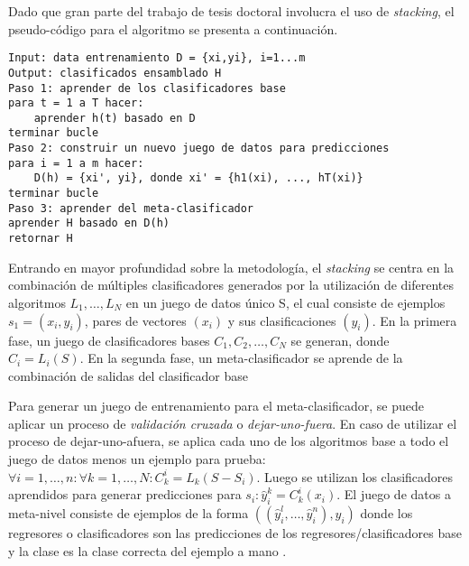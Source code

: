 Dado que gran parte del trabajo de tesis doctoral involucra el uso de \emph{stacking}, el pseudo-código para el algoritmo se presenta a continuación. \\

\begin{lstlisting}
Input: data entrenamiento D = {xi,yi}, i=1...m
Output: clasificados ensamblado H
Paso 1: aprender de los clasificadores base
para t = 1 a T hacer:
	aprender h(t) basado en D
terminar bucle
Paso 2: construir un nuevo juego de datos para predicciones
para i = 1 a m hacer:
	D(h) = {xi', yi}, donde xi' = {h1(xi), ..., hT(xi)}
terminar bucle
Paso 3: aprender del meta-clasificador
aprender H basado en D(h)
retornar H
\end{lstlisting}

Entrando en mayor profundidad sobre la metodología, el \emph{stacking} se centra en la combinación de múltiples clasificadores generados por la utilización de diferentes algoritmos $L_1, \ldots, L_N$ en un juego de datos único S, el cual consiste de ejemplos $s_1 = (x_i, y_i)$, pares de vectores $(x_i)$ y sus clasificaciones $(y_i)$. En la primera fase, un juego de clasificadores bases $C_1, C_2, \ldots, C_N$ se generan, donde $C_i = L_i(S)$. En la segunda fase, un meta-clasificador se aprende de la combinación de salidas del clasificador base \cite{wolpert}

Para generar un juego de entrenamiento para el meta-clasificador, se puede aplicar un proceso de \emph{validación cruzada} o \emph{dejar-uno-fuera}. En caso de utilizar el proceso de dejar-uno-afuera, se aplica cada uno de los algoritmos base a todo el juego de datos menos un ejemplo para prueba: $\forall i = 1, \ldots, n : \forall k = 1, \ldots, N : C^{i}_{k} = L_k(S - S_i)$. Luego se utilizan los clasificadores aprendidos para generar predicciones para $s_i : \hat{y}^{k}_{i} = C^{i}_{k}(x_i)$. El juego de datos a meta-nivel consiste de ejemplos de la forma $((\hat{y}^{l}_{i}, \ldots, \hat{y}^{n}_{i}), y_i)$ donde los regresores o clasificadores son las predicciones de los regresores/clasificadores base y la clase es la clase correcta del ejemplo a mano \cite{DzeroskiZenko}.

